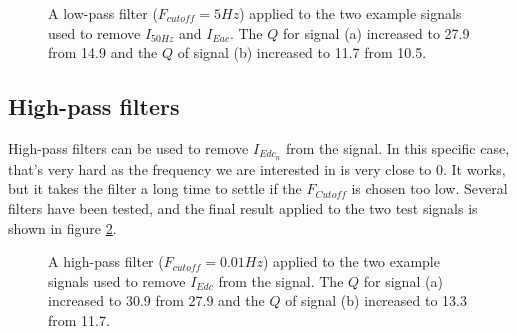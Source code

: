 \begin{figure}
	\centering     %
	\caption{A low-pass filter ($F_{cutoff} = 5Hz$) applied to the two example signals used to remove $I_{50Hz}$ and $I_{Eac}$. The $Q$ for signal (a) increased to 27.9 from 14.9 and the $Q$ of signal (b) increased to 11.7 from 10.5.\label{lowpass_example}}
\end{figure}

\subsection{High-pass filters}
High-pass filters can be used to remove $I_{Edc_{n}}$ from the signal. In this specific case, that's very hard as the frequency we are interested in is very close to 0. It works, but it takes the filter a long time to settle if the $F_{Cutoff}$ is chosen too low. Several filters have been tested, and the final result applied to the two test signals is shown in figure \ref{higpass_example}.

\begin{figure}
	\centering     %
	\caption{A high-pass filter ($F_{cutoff} = 0.01Hz$) applied to the two example signals used to remove $I_{Edc}$ from the signal. The $Q$ for signal (a) increased to 30.9 from 27.9 and the $Q$ of signal (b) increased to 13.3 from 11.7.\label{higpass_example}}
\end{figure}

